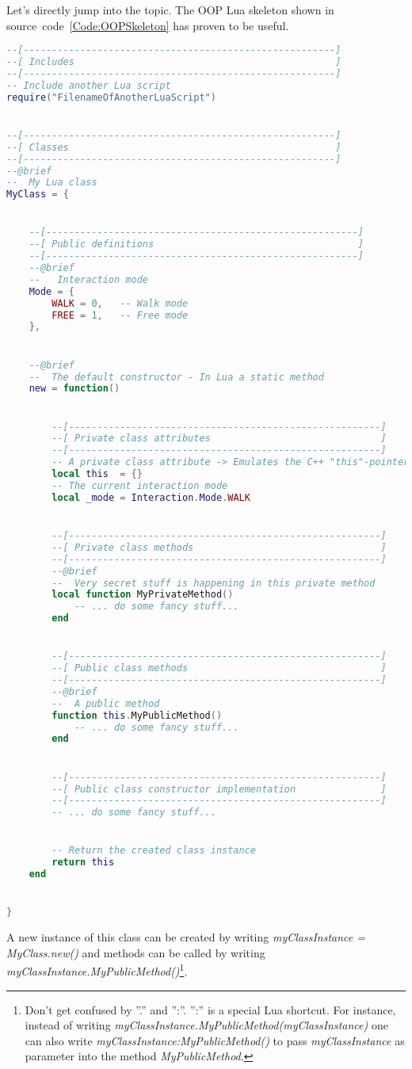 Let's directly jump into the topic. The OOP Lua skeleton shown in source~code~\ref{Code:OOPSkeleton} has proven to be useful.
\begin{lstlisting}[language=lua,label=Code:OOPSkeleton,caption={Object-oriented programming (OOP) Lua skeleton}]
--[-------------------------------------------------------]
--[ Includes                                              ]
--[-------------------------------------------------------]
-- Include another Lua script
require("FilenameOfAnotherLuaScript")


--[-------------------------------------------------------]
--[ Classes                                               ]
--[-------------------------------------------------------]
--@brief
--  My Lua class
MyClass = {


	--[-------------------------------------------------------]
	--[ Public definitions                                    ]
	--[-------------------------------------------------------]
	--@brief
	--   Interaction mode
	Mode = {
		WALK = 0,	-- Walk mode
		FREE = 1,	-- Free mode
	},


	--@brief
	--  The default constructor - In Lua a static method
	new = function()


		--[-------------------------------------------------------]
		--[ Private class attributes                              ]
		--[-------------------------------------------------------]
		-- A private class attribute -> Emulates the C++ "this"-pointer by using a Lua table
		local this	= {}
		-- The current interaction mode
		local _mode	= Interaction.Mode.WALK


		--[-------------------------------------------------------]
		--[ Private class methods                                 ]
		--[-------------------------------------------------------]
		--@brief
		--  Very secret stuff is happening in this private method
		local function MyPrivateMethod()
			-- ... do some fancy stuff...
		end


		--[-------------------------------------------------------]
		--[ Public class methods                                  ]
		--[-------------------------------------------------------]
		--@brief
		--  A public method
		function this.MyPublicMethod()
			-- ... do some fancy stuff...
		end


		--[-------------------------------------------------------]
		--[ Public class constructor implementation               ]
		--[-------------------------------------------------------]
		-- ... do some fancy stuff...


		-- Return the created class instance
		return this
	end


}
\end{lstlisting}
A new instance of this class can be created by writing \emph{myClassInstance = MyClass.new()} and methods can be called by writing \emph{myClassInstance.MyPublicMethod()}\footnote{Don't get confused by ''.'' and '':''. '':'' is a special Lua shortcut. For instance, instead of writing \emph{myClassInstance.MyPublicMethod(myClassInstance)} one can also write \emph{myClassInstance:MyPublicMethod()} to pass \emph{myClassInstance} as parameter into the method \emph{MyPublicMethod}.}.


